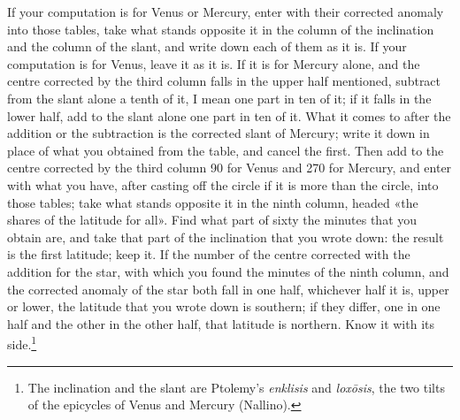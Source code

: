 \documentclass[11pt]{article}
\newcommand{\ArPage}[1]{\marginpar{\footnotesize\color{gray}Ar.\,p.\,#1}}
\begin{document}
\par \ArPage{175}If your computation is for Venus or Mercury, enter with their corrected anomaly into those tables, take what stands opposite it in the column of the inclination and the column of the slant, and write down each of them as it is. If your computation is for Venus, leave it as it is. If it is for Mercury alone, and the centre corrected by the third column falls in the upper half mentioned, subtract from the slant alone a tenth of it, I mean one part in ten of it; if it falls in the lower half, add to the slant alone one part in ten of it. What it comes to after the addition or the subtraction is the corrected slant of Mercury; write it down in place of what you obtained from the table, and cancel the first. Then add to the centre corrected by the third column 90 for Venus and 270 for Mercury, and enter with what you have, after casting off the circle if it is more than the circle, into those tables; take what stands opposite it in the ninth column, headed «the shares of the latitude for all». Find what part of sixty the minutes that you obtain are, and take that part of the inclination that you wrote down: the result is the first latitude; keep it. If the number of the centre corrected with the addition for the star, with which you found the minutes of the ninth column, and the corrected anomaly of the star both fall in one half, whichever half it is, upper or lower, the latitude that you wrote down is southern; if they differ, one in one half and the other in the other half, that latitude is northern. Know it with its side.\footnote{The inclination and the slant are Ptolemy's \emph{enklisis} and \emph{loxōsis}, the two tilts of the epicycles of Venus and Mercury (Nallino).}\par
\end{document}
